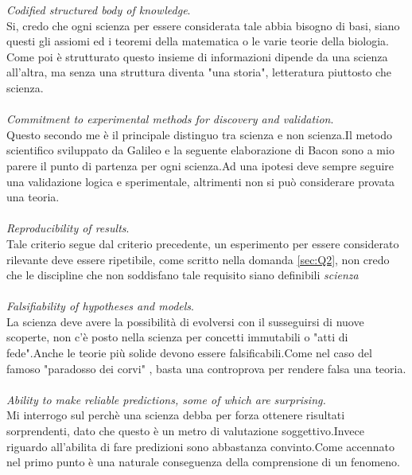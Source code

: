 \documentclass[a4paper]{article}
\begin{document}
\emph{Codified structured body of knowledge}.\\
Si, credo che ogni scienza per essere considerata tale abbia bisogno di basi, siano questi gli assiomi ed i teoremi della matematica o le varie teorie della biologia.
Come poi è strutturato questo insieme di informazioni dipende da una scienza all'altra, ma senza una struttura diventa "una storia", letteratura piuttosto che scienza.
\\\\

\emph{Commitment to experimental methods for discovery and validation}.\\
Questo secondo me è il principale distinguo tra scienza e non scienza.Il metodo scientifico sviluppato da Galileo e la seguente elaborazione di Bacon sono a mio parere il punto di partenza per ogni scienza.Ad una ipotesi deve sempre seguire una validazione logica e sperimentale, altrimenti non si può considerare provata una teoria.
\\\\

\emph{Reproducibility of results}.\\
Tale criterio segue dal criterio precedente, un esperimento per essere considerato rilevante deve essere ripetibile, come scritto nella domanda \ref{sec:Q2}, non credo che le discipline che non soddisfano tale requisito siano definibili \emph{scienza}
\\\\

\emph{Falsifiability of hypotheses and models}.\\
La scienza deve avere la possibilità di evolversi con il susseguirsi di nuove scoperte, non c'è posto nella scienza per concetti immutabili o "atti di fede".Anche le teorie più solide devono essere falsificabili.Come nel caso del famoso "paradosso dei corvi" \cite{corvi}, basta una controprova per rendere falsa una teoria.
\\\\

\emph{Ability to make reliable predictions, some of which are surprising.}\\ Mi interrogo sul perchè una scienza debba per forza ottenere risultati sorprendenti, dato che questo è un metro di valutazione soggettivo.Invece riguardo all'abilita di fare predizioni sono abbastanza convinto.Come accennato nel primo punto è una naturale conseguenza della comprensione di un fenomeno.
\end{document}
